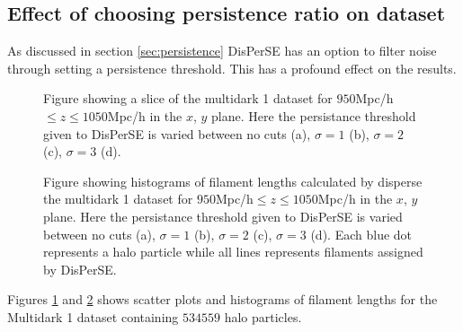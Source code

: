 \subsection{Effect of choosing persistence ratio on dataset}
As discussed in section \ref{sec:persistence} DisPerSE has an option to filter
noise through setting a persistence threshold. This has a profound effect on the
results.
\begin{figure}[htbp]\label{fig:scatterMD1}
    \hspace{1em}%
    \hspace{1em}%
    \caption{Figure showing a slice of the multidark 1 dataset for $950$Mpc/h$\leq z\leq1050$Mpc/h in the $x$, $y$ plane. Here the persistance threshold given to DisPerSE is varied between no cuts (a), $\sigma=1$ (b), $\sigma=2$ (c), $\sigma=3$ (d).}
\end{figure}
\begin{figure}[htbp]\label{fig:histMD1}
    \hspace{1em}%
    \hspace{1em}%
    \caption{Figure showing histograms of filament lengths calculated by disperse the multidark 1 dataset for $950$Mpc/h$\leq z\leq1050$Mpc/h in the $x$, $y$ plane. Here the persistance threshold given to DisPerSE is varied between no cuts (a), $\sigma=1$ (b), $\sigma=2$ (c), $\sigma=3$ (d). Each blue dot represents a halo particle while all lines represents filaments assigned by DisPerSE.}
\end{figure}
Figures \ref{fig:scatterMD1} and \ref{fig:histMD1} shows scatter plots and
histograms of filament lengths for the Multidark 1 dataset containing $534559$
halo particles.
